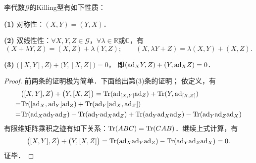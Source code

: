 \begin{theorem}\label{chlg:thm_Killing-sym}
    李代数$\mathscr{G}$的Killing型有如下性质：
    
    {\bfseries (1)} 对称性：$(X,Y)=(Y,X)$．
    
    {\bfseries (2)} 双线性性：$\forall X,Y,Z\in \mathscr{G}$，$\forall \lambda \in \mathbb{R}$或$\mathbb{C}$，有
    \begin{equation*}
        (X+ \lambda Y ,Z)= (X,Z)+ \lambda (Y,Z); \qquad
        (X, \lambda Y +Z ) =  \lambda (X,Y)+ (X,Z).
    \end{equation*}

    {\bfseries (3)} $\bigl([X,Y], Z\bigr)+ \bigl(Y, [X,Z]\bigr)=0$，
    即$({\rm ad}_X Y, Z)+ (Y, {\rm ad}_X Z)=0$．
\end{theorem}
\begin{proof}
    前两条的证明极为简单．下面给出第(3)条的证明；    依定义，有
    \begin{align*}
        &\bigl([X,Y], Z\bigr) + \bigl(Y, [X,Z]\bigr) 
        =  {\rm Tr} ({\rm ad}_{[X,Y]}  {\rm ad}_Z) + {\rm Tr} (Y, {\rm ad}_{[X,Z]}) \\
        =& {\rm Tr} ([{\rm ad}_{X}, {\rm ad}_{Y}]  {\rm ad}_Z)
          +{\rm Tr} ({\rm ad}_Y [{\rm ad}_{X}, {\rm ad}_{Z}]  ) \\
        =& {\rm Tr} ({\rm ad}_{X} {\rm ad}_{Y}  {\rm ad}_Z) -{\rm Tr} ( {\rm ad}_{Y} {\rm ad}_{X}  {\rm ad}_Z)
          +{\rm Tr} ({\rm ad}_Y {\rm ad}_{X} {\rm ad}_{Z} ) -{\rm Tr} ({\rm ad}_Y {\rm ad}_{Z} {\rm ad}_{X}  )
    \end{align*}
    有限维矩阵乘积之迹有如下关系：${\rm Tr}(ABC)={\rm Tr}(CAB)$．继续上式计算，有
    \begin{equation*}\label{chlg:eqn_LA-compact}
        \bigl([X,Y], Z\bigr) + \bigl(Y, [X,Z]\bigr) 
        ={\rm Tr} ({\rm ad}_{X} {\rm ad}_{Y}  {\rm ad}_Z)  -{\rm Tr} ({\rm ad}_Y {\rm ad}_{Z} {\rm ad}_{X}  )
        =0 .
    \end{equation*}
    证毕．
\end{proof}




